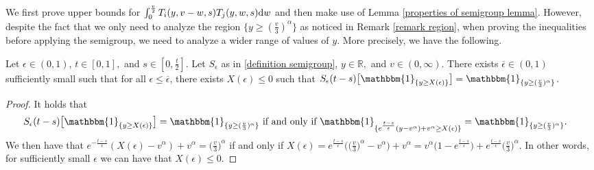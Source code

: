 \documentclass[11pt]{article}
\numberwithin{equation}{section}
\newcommand{\der}{\textup{d}}
\begin{document}
We first prove upper bounds for $\int_{0}^{\frac{v}{2}} T_{i}(y,v-w,s)T_{j}(y,w,s)\der w$ and then make use of Lemma \ref{properties of semigroup lemma}. However, despite the fact that we only need to analyze the region ${\{y\geq (\frac{v}{3})^{\alpha}\}}$ as noticed in Remark \ref{remark region}, when proving the inequalities before applying the semigroup, we need to analyze a wider range of values of $y$. More precisely, we have the following.
\begin{lem}
Let $\epsilon\in(0,1)$, $t\in[0,1],$ and $s\in[0,\frac{t}{2}]$. Let $S_{\epsilon}$ as in \eqref{definition semigroup}, $y\in\mathbb{R},$ and $v\in(0,\infty)$.  There exists $\overline{\epsilon}\in(0,1)$ sufficiently small such that for all $\epsilon\leq \overline{\epsilon}$, there exists $X(\epsilon)\leq 0$ such that $S_{\epsilon}(t-s)\big[\mathbbm{1}_{\{y\geq X(\epsilon)\}}\big] =\mathbbm{1}_{\{y\geq (\frac{v}{3})^{\alpha}\}}$.
\end{lem}
\begin{proof}
It holds that
\begin{align*}
S_{\epsilon}(t-s)\big[\mathbbm{1}_{\{y\geq X(\epsilon)\}}\big] =\mathbbm{1}_{\{y\geq (\frac{v}{3})^{\alpha}\}}&\textup{ if and only if }\mathbbm{1}_{\{e^{\frac{t-s}{\epsilon}}(y-v^{\alpha})+v^{\alpha}\geq X(\epsilon)\}} =\mathbbm{1}_{\{y\geq (\frac{v}{3})^{\alpha}\}}.
\end{align*}
We then have that $e^{-\frac{t-s}{\epsilon}}(X(\epsilon)-v^{\alpha})+v^{\alpha}= \Big(\frac{v}{3}\Big)^{\alpha}$ if and only if $ X(\epsilon)=e^{\frac{t-s}{\epsilon}}\Big(\Big(\frac{v}{3}\Big)^{\alpha}-v^{\alpha}\Big)+v^{\alpha}=v^{\alpha}\bigg(1-e^{\frac{t-s}{\epsilon}}\bigg)+e^{\frac{t-s}{\epsilon}}\Big(\frac{v}{3}\Big)^{\alpha}.$ In other words, for sufficiently small $\epsilon$ we can have that $X(\epsilon)\leq 0$.
\end{proof}
\end{document}
